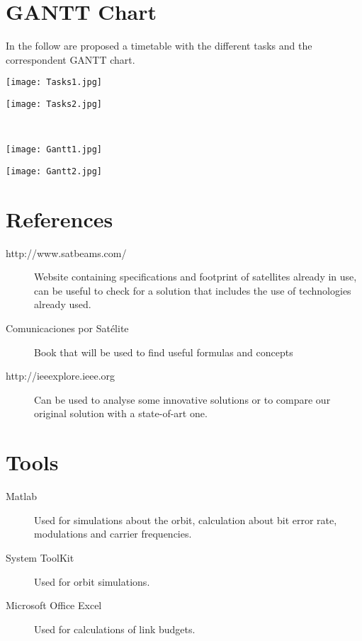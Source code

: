 \documentclass[11pt,a4paper,titlepage]{article}
\begin{document}
\section{GANTT Chart}{
	In the follow are proposed a timetable with the different tasks and the correspondent GANTT chart.

	\vspace{1cm}
	\begin{minipage}{0.48\textwidth}
		\centering
			\texttt{[image: Tasks1.jpg]}
			\label{fig:tasks1}
	\end{minipage}
	\begin{minipage}{0.48\textwidth}
		\centering
			\texttt{[image: Tasks2.jpg]}
			\label{fig:tasks2}
	\end{minipage}\\
	\begin{minipage}{0.48\textwidth}
		\centering
			\texttt{[image: Gantt1.jpg]}
			\label{fig:gantt1}
	\end{minipage}
	\begin{minipage}{0.48\textwidth}
		\centering
			\texttt{[image: Gantt2.jpg]}
			\label{fig:gantt2}
	\end{minipage}

}\label{sec:gantt}

\section{References}{
	\begin{description}
		\item [http://www.satbeams.com/] Website containing specifications and footprint of satellites already in use, can be useful to check for a solution that includes the use of technologies already used.
		\item [Comunicaciones por Satélite] Book that will be used to find useful formulas and concepts
		\item [http://ieeexplore.ieee.org] Can be used to analyse some innovative solutions or to compare our original solution with a state-of-art one.
	\end{description}
}

\section{Tools}{
	\begin{description}
		\item [Matlab] Used for simulations about the orbit, calculation about bit error rate, modulations and carrier frequencies.
		\item [System ToolKit] Used for orbit simulations.
		\item [Microsoft Office Excel] Used for calculations of link budgets.
	\end{description}
}
\end{document}
